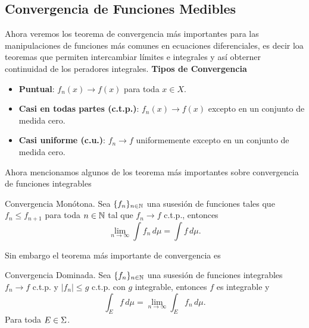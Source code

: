 \documentclass[main.tex]{subfiles}
\begin{document}
\subsection{Convergencia de Funciones Medibles}
\noindent Ahora veremos los teorema de convergencia más importantes para las manipulaciones de funciones más comunes en ecuaciones diferenciales, es decir loa teoremas que permiten intercambiar límites e integrales y así obterner continuidad de los peradores integrales.
\noindent\textbf{Tipos de Convergencia}
\begin{itemize}
    \item \textbf{Puntual}: $f_n(x) \to f(x)$ para toda $x\in X$.
    \item \textbf{Casi en todas partes (c.t.p.)}: $f_n(x) \to f(x)$ excepto en un conjunto de medida cero.
    \item \textbf{Casi uniforme (c.u.)}: $f_n \to f$ uniformemente excepto en un conjunto de medida cero.
\end{itemize}
Ahora mencionamos algunos de los teorema más importantes sobre convergencia de funciones integrables
\begin{teorema}{Convergencia Monótona.}
  Sea $\{f_n\}_{n\in \mathbb N }$ una susesión de funciones tales que $f_n \leq f_{n+1}$ para toda $n\in \mathbb N $ tal que $f_n\to f$ c.t.p., entonces
\[
  \lim_{n \to \infty} \int f_n \, d\mu = \int f \, d\mu.
  \]
  \end{teorema}
Sin embargo el teorema más importante de convergencia es
\begin{teorema}{Convergencia Dominada.}
Sea $\{f_n\}_{n\in \mathbb N }$ una susesión de funciones integrables $f_n \to f$ c.t.p. y $|f_n| \leq g$ c.t.p. con $g$ integrable, entonces $f$ es integrable y
\[
 \int_E f \, d\mu=\lim_{n \to \infty} \int_E f_n \, d\mu.
\]
\noindent Para toda $E\in\Sigma$.
\end{teorema}
\end{document}
